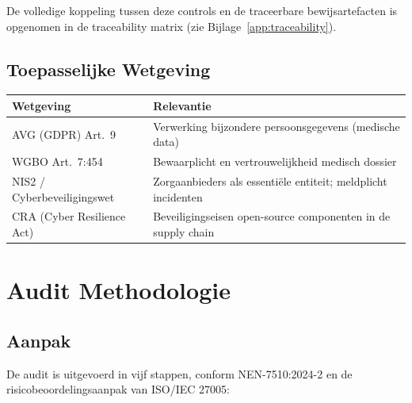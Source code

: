 \documentclass[12pt, a4paper]{report}
\begin{document}
\vspace{0.8em}
De volledige koppeling tussen deze controls en de traceerbare
bewijsartefacten is opgenomen in de traceability matrix
(zie Bijlage~\ref{app:traceability}).

\section{Toepasselijke Wetgeving}
\label{sec:wetgeving}

\begin{tabularx}{\textwidth}{@{}lX}
    \toprule
    \textbf{Wetgeving} & \textbf{Relevantie} \\
    \midrule
    AVG (GDPR) Art.~9           & Verwerking bijzondere persoonsgegevens (medische data) \\
    WGBO Art.~7:454             & Bewaarplicht en vertrouwelijkheid medisch dossier \\
    NIS2 / Cyberbeveiligingswet & Zorgaanbieders als essentiële entiteit; meldplicht incidenten \\
    CRA (Cyber Resilience Act)  & Beveiligingseisen open-source componenten in de supply chain \\
    \bottomrule
\end{tabularx}

\newpage

\chapter{Audit Methodologie}
\label{ch:methodologie}

\section{Aanpak}
\label{sec:aanpak}

De audit is uitgevoerd in vijf stappen, conform NEN-7510:2024-2 en de
risicobeoordelingsaanpak van ISO/IEC 27005:
\end{document}
